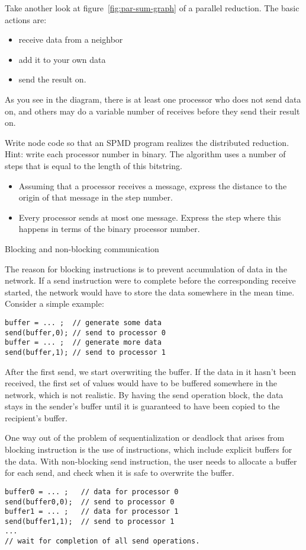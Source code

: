 \begin{exercise}
  Take another look at figure~\ref{fig:par-sum-graph} of a parallel
  reduction. The basic actions are:
  \begin{itemize}
  \item receive data from a neighbor
  \item add it to your own data
  \item send the result on.
  \end{itemize}
  As you see in the diagram, there is at least one processor who does
  not send data on, and others may do a variable number of receives
  before they send their result on.

  Write node code so that an \ac{SPMD} program realizes the
  distributed reduction. Hint: write each processor number in
  binary. The algorithm uses a number of steps that is equal to the
  length of this bitstring.
  \begin{itemize}
  \item Assuming that a processor receives a message, express the
    distance to the origin of that message in the step number.
  \item Every processor sends at most one message. Express the step 
    where this happens in terms of the binary processor number.
  \end{itemize}
\end{exercise}

 {Blocking and non-blocking communication}

The reason for blocking instructions is to prevent accumulation of
data in the network. If a send instruction were to complete before the
corresponding receive started, the network would have to store the
data somewhere in the mean time.
Consider a simple example:
\begin{verbatim}
buffer = ... ;  // generate some data
send(buffer,0); // send to processor 0
buffer = ... ;  // generate more data
send(buffer,1); // send to processor 1
\end{verbatim}
After the first send, we start overwriting the buffer. If the data in
it hasn't been received, the first set of values would have to be
buffered somewhere in the network, which is not realistic.
By having the send operation block,
the data stays in the sender's buffer until it is guaranteed to have
been copied to the recipient's buffer.

One way out of the problem of sequentialization or deadlock that
arises from blocking instruction is the use
of  instructions, which include
explicit buffers for the data. With non-blocking send instruction, the
user needs to allocate a buffer for each send, and check when it is
safe to overwrite the buffer.
\begin{verbatim}
buffer0 = ... ;   // data for processor 0
send(buffer0,0);  // send to processor 0
buffer1 = ... ;   // data for processor 1
send(buffer1,1);  // send to processor 1
...
// wait for completion of all send operations.
\end{verbatim}

